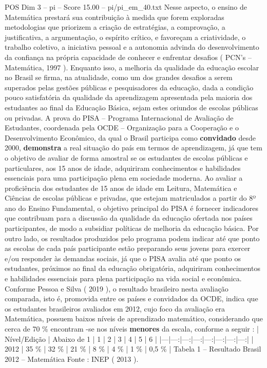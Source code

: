 \begin{textsample}{POS Dim 3 – pi – Score 15.00 – pi/pi\_em\_40.txt}
Nesse aspecto, o ensino de Matemática prestará sua contribuição à medida que forem exploradas metodologias que priorizem a criação de estratégias, a comprovação, a justificativa, a argumentação, o espírito crítico, e favoreçam a criatividade, o trabalho coletivo, a iniciativa pessoal e a autonomia advinda do desenvolvimento da confiança na própria capacidade de conhecer e enfrentar desafios ( PCN’s – Matemática, 1997 ).
Enquanto isso, a melhoria da qualidade da educação escolar no Brasil se firma, na atualidade, como um dos grandes desafios a serem superados pelas gestões públicas e pesquisadores da educação, dada a condição pouco satisfatória da qualidade da aprendizagem apresentada pela maioria dos estudantes ao final da Educação Básica, sejam estes oriundos de escolas públicas ou privadas.
A prova do PISA – Programa Internacional de Avaliação de Estudantes, coordenada pela OCDE – Organização para a Cooperação e o Desenvolvimento Econômico, da qual o Brasil participa como \textbf{convidado} desde 2000, \textbf{demonstra} a real situação do país em termos de aprendizagem, já que tem o objetivo de avaliar de forma amostral se os estudantes de escolas públicas e particulares, aos 15 anos de idade, adquiriram conhecimentos e habilidades essenciais para uma participação plena em sociedade moderna.
Ao avaliar a proficiência dos estudantes de 15 anos de idade em Leitura, Matemática e Ciências de escolas públicas e privadas, que estejam matriculados a partir do 8º ano do Ensino Fundamental, o objetivo principal do PISA é fornecer indicadores que contribuam para a discussão da qualidade da educação ofertada nos países participantes, de modo a subsidiar políticas de melhoria da educação básica.
Por outro lado, os resultados produzidos pelo programa podem indicar até que ponto as escolas de cada país participante estão preparando seus jovens para exercer e/ou responder às demandas sociais, já que o PISA avalia até que ponto os estudantes, próximos ao final da educação obrigatória, adquiriram conhecimentos e habilidades essenciais para plena participação na vida social e econômica.
Conforme Pessoa e Silva ( 2019 ), o resultado brasileiro nesta avaliação comparada, isto é, promovida entre os países e convidados da OCDE, indica que os estudantes brasileiros avaliados em 2012, cujo foco da avaliação era Matemática, possuem baixos níveis de aprendizado matemático, considerando que cerca de 70 \% encontram -se nos níveis \textbf{menores} da escala, conforme a seguir : | Nível/Edição | Abaixo de 1 | 1 | 2 | 3 | 4 | 5 | 6 | |---|---:|---:|---:|---:|---:|---:|---:| | 2012 | 35 \% | 32 \% | 21 \% | 8 \% | 4 \% | 1 \% | 0,5 \% | Tabela 1 – Resultado Brasil 2012 – Matemática Fonte : INEP ( 2013 ).

\end{textsample}

